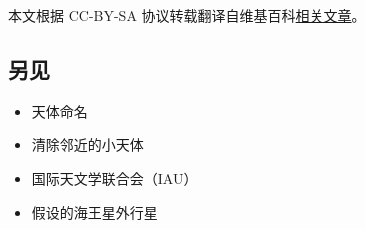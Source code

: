 
本文根据 CC-BY-SA 协议转载翻译自维基百科\href{https://en.wikipedia.org/wiki/Eris_(dwarf_planet)}{相关文章}。





















\subsection{另见}
\begin{itemize}
\item 天体命名
\item 清除邻近的小天体
\item 国际天文学联合会（IAU）
\item 假设的海王星外行星
\end{itemize}
